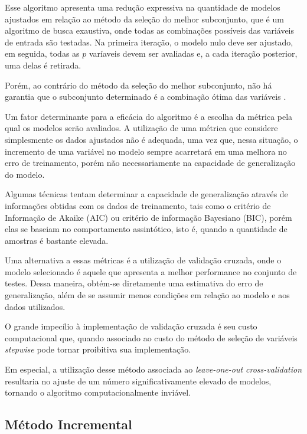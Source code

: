 \qquad

Esse algoritmo apresenta uma redução expressiva na quantidade de modelos ajustados em relação ao método da seleção do melhor subconjunto, que é um algoritmo de busca exaustiva, onde todas as combinações possíveis das variáveis de entrada são testadas. Na primeira iteração, o modelo nulo deve ser ajustado, em seguida, todas as $p$ varíaveis devem ser avaliadas e, a cada iteração posterior, uma delas é retirada.

Porém, ao contrário do método da seleção do melhor subconjunto, não há garantia que o subconjunto determinado é a combinação ótima das variáveis \cite[p. 208]{intro_stat_learn}.

Um fator determinante para a eficácia do algoritmo é a escolha da métrica pela qual os modelos serão avaliados. A utilização de uma métrica que considere simplesmente os dados ajustados não é adequada, 
uma vez que, nessa situação, o incremento de uma variável no modelo sempre acarretará em uma melhora no erro de treinamento, porém não necessariamente na capacidade de generalização do modelo.

Algumas técnicas tentam determinar a capacidade de generalização através de informações obtidas com os dados de treinamento, tais como o critério de Informação de Akaike (AIC) ou critério de informação Bayesiano (BIC), porém elas se baseiam no comportamento assintótico, isto é, quando a quantidade de amostras é bastante elevada.

Uma alternativa a essas métricas é a utilização de validação cruzada, onde o modelo selecionado é aquele que apresenta a melhor performance no conjunto de testes. Dessa maneira, obtém-se diretamente uma estimativa do erro de generalização, além de se assumir menos condições em relação ao modelo e aos dados utilizados. 

O grande impecílio à implementação de validação cruzada é seu custo computacional que, quando associado ao custo do método de seleção de variáveis \textit{stepwise} pode tornar proibitiva sua implementação.

Em especial, a utilização desse método associada ao \textit{leave-one-out cross-validation} resultaria no ajuste de um número significativamente elevado de modelos, tornando o algoritmo computacionalmente inviável.

\subsection{Método Incremental}

